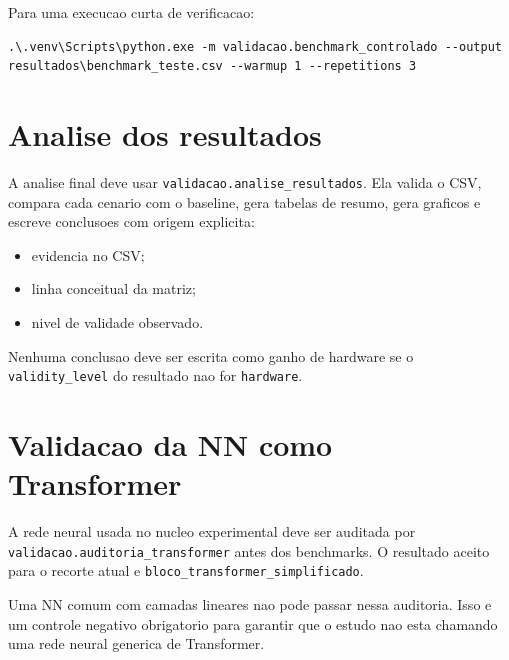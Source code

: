 Para uma execucao curta de verificacao:



\begin{Verbatim}[fontsize=\small,breaklines=true,label=powershell]
.\.venv\Scripts\python.exe -m validacao.benchmark_controlado --output resultados\benchmark_teste.csv --warmup 1 --repetitions 3
\end{Verbatim}



\section{Analise dos resultados}





A analise final deve usar \texttt{validacao.\allowbreak{}analise\_\allowbreak{}resultados}. Ela valida o CSV, compara cada cenario com o baseline, gera tabelas de resumo, gera graficos e escreve conclusoes com origem explicita:


\begin{itemize}
\item evidencia no CSV;
\item linha conceitual da matriz;
\item nivel de validade observado.
\end{itemize}



Nenhuma conclusao deve ser escrita como ganho de hardware se o \texttt{validity\_\allowbreak{}level} do resultado nao for \texttt{hardware}.



\section{Validacao da NN como Transformer}





A rede neural usada no nucleo experimental deve ser auditada por \texttt{validacao.\allowbreak{}auditoria\_\allowbreak{}transformer} antes dos benchmarks. O resultado aceito para o recorte atual e \texttt{bloco\_\allowbreak{}transformer\_\allowbreak{}simplificado}.





Uma NN comum com camadas lineares nao pode passar nessa auditoria. Isso e um controle negativo obrigatorio para garantir que o estudo nao esta chamando uma rede neural generica de Transformer.




